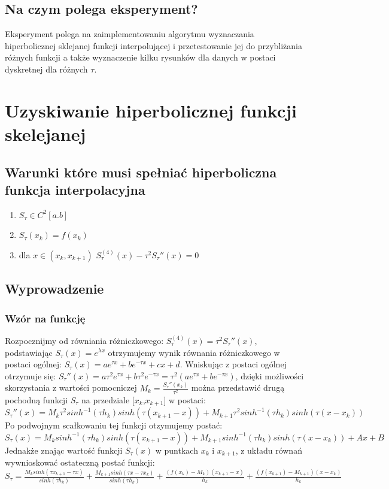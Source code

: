 \documentclass{article}
\begin{document}
\subsection{Na czym polega eksperyment?}
Eksperyment polega na zaimplementowaniu algorytmu wyznaczania hiperbolicznej sklejanej funkcji interpolującej i przetestowanie jej do przybliżania różnych funkcji a także wyznaczenie kilku rysunków dla danych w postaci dyskretnej dla różnych $\tau$.
\newpage
\section{Uzyskiwanie hiperbolicznej funkcji skelejanej}
\subsection{Warunki które musi spełniać hiperboliczna funkcja interpolacyjna}
\begin{enumerate}
\item $S_{\tau} \in C^{2}[a.b]$
\item $S_{\tau}(x_{k}) = f(x_{k})$
\item dla $x \in (x_{k}, x_{k+1})$ $S_{\tau}^{(4)}(x)-\tau^{2}S_{\tau}''(x)=0$
\end{enumerate}
\subsection{Wyprowadzenie}
\subsubsection{Wzór na funkcję}
Rozpocznijmy od równiania różniczkowego: 
$S_{\tau}^{(4)}(x)=\tau^{2}S_{\tau}''(x)$, podstawiając $S_{\tau}(x) = e^{\lambda x}$ 
otrzymujemy wynik równania różniczkowego w postaci ogólnej: $S_{\tau}(x)=ae^{\tau x}+be^{-\tau x}+cx+d$. Wniskując z postaci ogólnej otrzymuje się: $S_{\tau}''(x)=a \tau^2e^{\tau x} + b \tau^2e^{-\tau x}=\tau^2(ae^{\tau x} + be^{-\tau x})$, dzięki możliwości skorzystania z wartości pomocniczej $M_{k}=\frac{S_{\tau}''(x_k)}{\tau^2}$ można przedstawić drugą pochodną funkcji $S_{\tau}$ na przedziale [$x_k$,$x_{k+1}$] w postaci: 
\newline
$S_{\tau}''(x)=M_{k} \tau^2sinh^{-1}(\tau h_k)sinh(\tau(x_{k+1}-x))+M_{k+1} \tau^2sinh^{-1}(\tau h_k)sinh(\tau(x-x_k))$ 
\newline
Po podwojnym scałkowaniu tej funkcji otzymujemy postać: 
\newline
$S_{\tau}(x)=M_{k} sinh^{-1}(\tau h_k)sinh(\tau(x_{k+1}-x))+M_{k+1} sinh^{-1}(\tau h_k)sinh(\tau(x-x_k))+Ax+B$
Jednakże znając wartość funkcji $S_{\tau}(x)$ w puntkach $x_k$ i $x_{k+1}$, z układu równań wywnioskować ostateczną postać funkcji:
\newline
$S_{\tau}=\frac{M_{k}sinh(\tau x_{k+1}-\tau x)}{sinh(\tau h_{k})} + \frac{M_{k+1}sinh(\tau x - \tau x_{k})}{sinh(\tau h_{k})} + \frac{(f(x_{k})-M_{k})(x_{k+1}-x)}{h_{k}} + \frac{(f(x_{k+1})-M_{k+1})(x-x_{k})}{h_{k}}$
\end{document}
